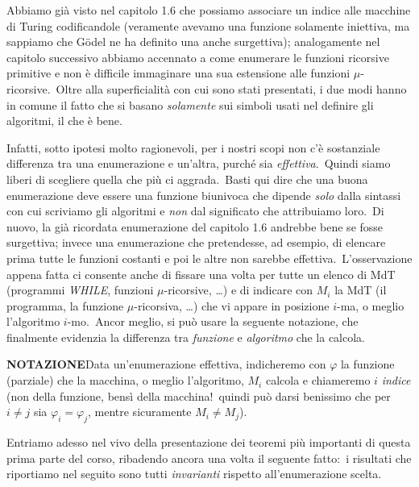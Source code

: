 \noindent Abbiamo già visto nel capitolo 1.6 che possiamo associare un indice alle macchine di Turing codificandole (veramente avevamo una funzione solamente iniettiva, ma sappiamo che Gödel ne ha definito una anche surgettiva); analogamente nel capitolo successivo abbiamo accennato a come enumerare le funzioni ricorsive primitive e non è diﬃcile immaginare una sua estensione alle funzioni $\mu$-ricorsive.\
Oltre alla superficialità con cui sono stati presentati, i due modi hanno in comune il fatto che si basano \textit{solamente} sui simboli usati nel definire gli algoritmi, il che è bene.\

Infatti, sotto ipotesi molto ragionevoli, per i nostri scopi non c'è sostanziale differenza tra una enumerazione e un'altra, purché sia \textit{effettiva}.\
Quindi siamo liberi di scegliere quella che più ci aggrada.\
Basti qui dire che una buona enumerazione deve essere una funzione biunivoca che dipende \textit{solo} dalla sintassi con cui scriviamo gli algoritmi e \textit{non} dal significato che attribuiamo loro.\
Di nuovo, la già ricordata enumerazione del capitolo 1.6 andrebbe bene se fosse surgettiva; invece una enumerazione che pretendesse, ad esempio, di elencare prima tutte le funzioni costanti e poi le altre non sarebbe effettiva.\
L'osservazione appena fatta ci consente anche di fissare una volta per tutte un elenco di MdT (programmi \textit{\footnotesize WHILE}, funzioni $\mu$-ricorsive, \dots) e di indicare con $M_i$ la MdT (il programma, la funzione $\mu$-ricorsiva, \dots) che vi appare in posizione $i$-ma, o meglio l'algoritmo $i$-mo.\
Ancor meglio, si può usare la seguente notazione, che finalmente evidenzia la differenza tra \textit{funzione} e \textit{algoritmo} che la calcola.

\vspace{12pt}

\noindent\textbf{NOTAZIONE}\quad Data un'enumerazione effettiva, indicheremo con $\varphi$ la funzione (parziale) che la macchina, o meglio l'algoritmo, $M_i$ calcola e chiameremo $i$ \textit{indice} (non della funzione, bensì della macchina!\ quindi può darsi benissimo che per $i \neq j$ sia $\varphi_i = \varphi_j$, mentre sicuramente $M_i \neq M_j$).

\vspace{12pt}

\noindent Entriamo adesso nel vivo della presentazione dei teoremi più importanti di questa prima parte del corso, ribadendo ancora una volta il seguente fatto:\ i risultati che riportiamo nel seguito sono tutti \textit{invarianti} rispetto all'enumerazione scelta.\

